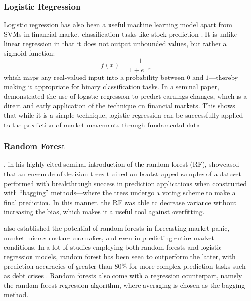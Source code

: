 \documentclass[stu,floatsintext]{apa7}
\begin{document}
\subsubsection{Logistic Regression}

Logistic regression has also been a useful machine learning model apart from SVMs in financial market classification tasks like stock prediction \parencite{jarmulska2021random}. It is unlike linear regression in that it does not output unbounded values, but rather a sigmoid function:
\begin{equation}f(x)=\frac{1}{1 + e^{-x}}\end{equation}
which maps any real-valued input into a probability between $0$ and $1$—thereby making it appropriate for binary classification tasks. In a seminal paper, \textcite{ou1989financial} demonstrated the use of logistic regression to predict earnings changes, which is a direct and early application of the technique on financial markets. This shows that while it is a simple technique, logistic regression can be successfully applied to the prediction of market movements through fundamental data.

\subsubsection{Random Forest}

\textcite{breiman2001random}, in his highly cited seminal introduction of the random forest (RF), showcased that an ensemble of decision trees trained on bootstrapped samples of a dataset performed with breakthrough success in prediction applications when constructed with “bagging” methods—where the trees undergo a voting scheme to make a final prediction. In this manner, the RF was able to decrease variance without increasing the bias, which makes it a useful tool against overfitting.

\textcite{jarmulska2021random} also established the potential of random forests in forecasting market panic, market microstructure anomalies, and even in predicting entire market conditions. In a lot of studies employing both random forests and logistic regression models, random forest has been seen to outperform the latter, with prediction accuracies of greater than 80\% for more complex prediction tasks such as debt crises \parencite{aldasoro2025predicting}. Random forests also come with a regression counterpart, namely the random forest regression algorithm, where averaging is chosen as the bagging method.
\end{document}
